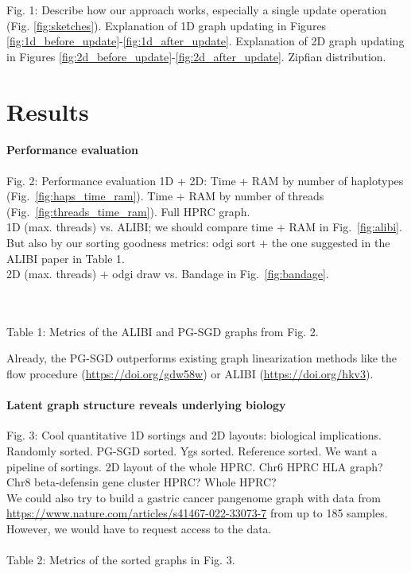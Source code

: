 \documentclass{bioinfo}
\theoremstyle{definition}
\begin{document}
Fig. 1: Describe how our approach works, especially a single update operation (Fig. \ref{fig:sketches}). Explanation of 1D graph updating in Figures \ref{fig:1d_before_update}-\ref{fig:1d_after_update}. Explanation of 2D graph updating in Figures \ref{fig:2d_before_update}-\ref{fig:2d_after_update}. Zipfian distribution.



\section{Results}
\label{sec:results}



\paragraph{Performance evaluation}
Fig. 2: Performance evaluation 1D + 2D: Time + RAM by number of haplotypes (Fig.~\ref{fig:haps_time_ram}). Time + RAM by number of threads (Fig.~\ref{fig:threads_time_ram}). Full HPRC graph.
\\
1D (max. threads) vs. ALIBI; we should compare time + RAM in Fig.~\ref{fig:alibi}.
But also by our sorting goodness metrics: odgi sort + the one suggested in the ALIBI paper in Table 1.
\\
2D (max. threads) + odgi draw vs. Bandage in Fig.~\ref{fig:bandage}.

\\
\\
Table 1: Metrics of the ALIBI and PG-SGD graphs from Fig. 2.

Already, the PG-SGD outperforms existing graph linearization methods like the flow procedure (\url{https://doi.org/gdw58w}) or ALIBI (\url{https://doi.org/hkv3}).
\paragraph{Latent graph structure reveals underlying biology}
Fig. 3: Cool quantitative 1D sortings and 2D layouts: biological implications.
Randomly sorted. PG-SGD sorted. Ygs sorted. Reference sorted.
We want a pipeline of sortings. 2D layout of the whole HPRC.
Chr6 HPRC HLA graph? Chr8 beta-defensin gene cluster HPRC? Whole HPRC?
\\
We could also try to build a gastric cancer pangenome graph with data from \url{https://www.nature.com/articles/s41467-022-33073-7} from up to 185 samples.
However, we would have to request access to the data.
\\
\\

Table 2: Metrics of the sorted graphs in Fig. 3.

\end{document}
